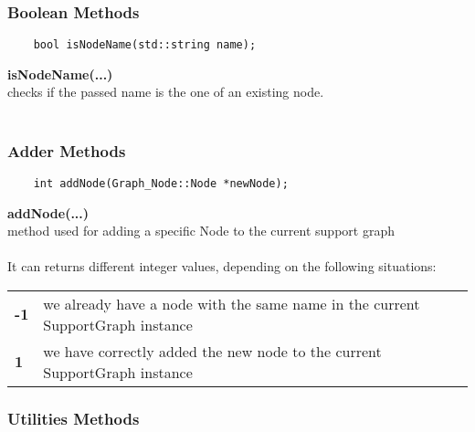 \documentclass{article}
\begin{document}
\subsubsection{Boolean Methods}

\begin{mdframed}[hidealllines=true, backgroundcolor=magenta!10]
	\begin{lstlisting}
	bool isNodeName(std::string name);
	\end{lstlisting}
\end{mdframed}

\textbf{isNodeName(...)}\\
checks if the passed name is the one of an existing node.\\\\

\subsubsection{Adder Methods}

\begin{mdframed}[hidealllines=true, backgroundcolor=magenta!10]
	\begin{lstlisting}
	int addNode(Graph_Node::Node *newNode);
	\end{lstlisting}
\end{mdframed}

\textbf{addNode(...)}\\
method used for adding a specific Node to the current support graph\\\\

It can returns different integer values, depending on the following situations:\\

\begin{tabular}{ll}
	\textbf{-1} & we already have a node with the same name in the current SupportGraph instance\\
	\textbf{ 1} & we have correctly added the new node to the current SupportGraph instance%
\end{tabular}

\subsubsection{Utilities Methods}
\end{document}
